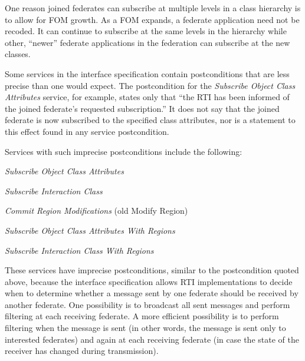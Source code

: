 \clearpage

\begin{annexstdpage}


    One reason joined federates can subscribe at multiple levels in a class hierarchy is to allow for FOM growth. As a FOM expands, a federate application need not be recoded. It can continue to subscribe at the same levels in the hierarchy while other, ``newer'' federate applications in the federation can subscribe at the new classes.

    Some services in the interface specification contain postconditions that are less precise than one would expect. The postcondition for the \textit{Subscribe Object Class Attributes} service, for example, states only that ``the RTI has been informed of the joined federate's requested subscription.'' It does not say that the joined federate is now subscribed to the specified class attributes, nor is a statement to this effect found in any service postcondition.

    Services with such imprecise postconditions include the following:

    \begin{stddashlist}
        \item \textit{Subscribe Object Class Attributes}
        \item \textit{Subscribe Interaction Class}
        \item \textit{Commit Region Modifications} (old Modify Region)
        \item \textit{Subscribe Object Class Attributes With Regions}
        \item \textit{Subscribe Interaction Class With Regions}
    \end{stddashlist}

    These services have imprecise postconditions, similar to the postcondition quoted above, because the interface specification allows RTI implementations to decide when to determine whether a message sent by one federate should be received by another federate. One possibility is to broadcast all sent messages and perform filtering at each receiving federate. A more efficient possibility is to perform filtering when the message is sent (in other words, the message is sent only to interested federates) and again at each receiving federate (in case the state of the receiver has changed during transmission).


\end{annexstdpage}
